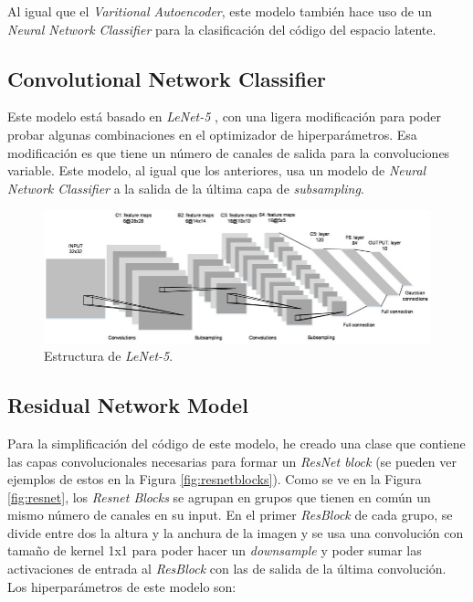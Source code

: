 Al igual que el \textit{Varitional Autoencoder}, este modelo también hace uso de un \textit{Neural Network Classifier} para la clasificación del código del espacio latente.

\subsection{Convolutional Network Classifier}\label{subsec:convnet}

Este modelo está basado en \textit{LeNet-5} \cite{Lecun98gradient-basedlearning}, con una ligera modificación para poder probar algunas combinaciones en el optimizador de hiperparámetros. Esa modificación es que tiene un número de canales de salida para la convoluciones variable. Este modelo, al igual que los anteriores, usa un modelo de \textit{Neural Network Classifier} a la salida de la última capa de \textit{subsampling}.

\begin{figure}[H]
	\includegraphics[scale=0.4]{imagenes/05_Implementacion/lenet5.png}
	\centering
	\caption{Estructura de \textit{LeNet-5}. \cite{Lecun98gradient-basedlearning}}
	\label{fig:convnet}
\end{figure}

\subsection{Residual Network Model}\label{subsec:resnetarch}
\label{subsec:resnet}

Para la simplificación del código de este modelo, he creado una clase que contiene las capas convolucionales necesarias para formar un \textit{ResNet block} (se pueden ver ejemplos de estos en la Figura \ref{fig:resnetblocks}). Como se ve en la Figura \ref{fig:resnet}, los \textit{Resnet Blocks} se agrupan en grupos que tienen en común un mismo número de canales en su input. En el primer \textit{ResBlock} de cada grupo, se divide entre dos la altura y la anchura de la imagen y se usa una convolución con tamaño de kernel 1x1 para poder hacer un \textit{downsample} y poder sumar las activaciones de entrada al \textit{ResBlock} con las de salida de la última convolución. Los hiperparámetros de este modelo son:

